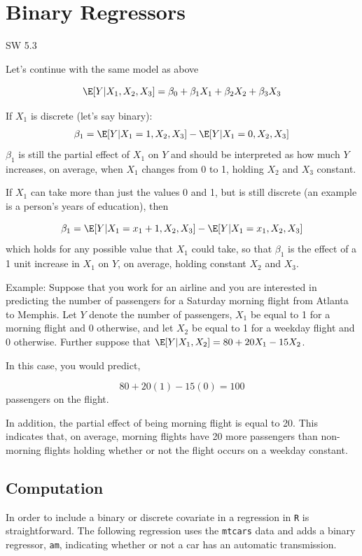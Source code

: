\documentclass[
  letterpaper,
  DIV=11,
  numbers=noendperiod]{scrreprt}
\begin{document}
\section{Binary Regressors}\label{binary-regressors}

SW 5.3

Let's continue with the same model as above

\[
  \E[Y|X_1,X_2,X_3] = \beta_0 + \beta_1 X_1 + \beta_2 X_2 + \beta_3 X_3
\]

If \(X_1\) is discrete (let's say binary): \begin{align*}
  \beta_1 = \E[Y|X_1=1,X_2,X_3] - \E[Y|X_1=0,X_2,X_3]
\end{align*} \(\beta_1\) is still the partial effect of \(X_1\) on \(Y\)
and should be interpreted as how much \(Y\) increases, on average, when
\(X_1\) changes from 0 to 1, holding \(X_2\) and \(X_3\) constant.

If \(X_1\) can take more than just the values 0 and 1, but is still
discrete (an example is a person's years of education), then

\[
  \beta_1 = \E[Y | X_1=x_1+1, X_2, X_3] - \E[Y|X_1=x_1, X_2, X_3]
\] which holds for any possible value that \(X_1\) could take, so that
\(\beta_1\) is the effect of a 1 unit increase in \(X_1\) on \(Y\), on
average, holding constant \(X_2\) and \(X_3\).

{Example: }Suppose that you work for an airline and you are interested
in predicting the number of passengers for a Saturday morning flight
from Atlanta to Memphis. Let \(Y\) denote the number of passengers,
\(X_1\) be equal to 1 for a morning flight and 0 otherwise, and let
\(X_2\) be equal to 1 for a weekday flight and 0 otherwise. Further
suppose that \(\E[Y|X_1,X_2] = 80 + 20 X_1 - 15 X_2\).

In this case, you would predict,

\[
  80 + 20 (1) - 15 (0) = 100
\] passengers on the flight.

In addition, the partial effect of being morning flight is equal to 20.
This indicates that, on average, morning flights have 20 more passengers
than non-morning flights holding whether or not the flight occurs on a
weekday constant.

\subsection{Computation}\label{computation-2}

In order to include a binary or discrete covariate in a regression in
\texttt{R} is straightforward. The following regression uses the
\texttt{mtcars} data and adds a binary regressor, \texttt{am},
indicating whether or not a car has an automatic transmission.
\end{document}
